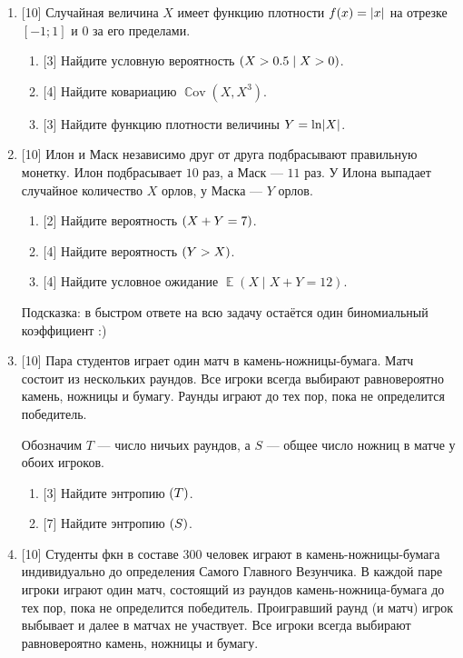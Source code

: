 \documentclass[12pt]{article}
\DeclareMathOperator{\Cov}{\mathbb{C}ov}
\let\P\relax
\DeclareMathOperator{\P}{\mathbb{P}}
\let\H\relax
\DeclareMathOperator{\H}{\mathbb{H}}
\DeclareMathOperator{\E}{\mathbb{E}}
\DeclarePairedDelimiter{\abs}{\lvert}{\rvert}
\begin{document}
\begin{enumerate}
    \item {[10]} Случайная величина $X$ имеет функцию плотности $f(x) = \abs{x}$ на отрезке $[-1;1]$ и $0$ за его пределами.
    \begin{enumerate}
        \item {[3]} Найдите условную вероятность $\P(X > 0.5 \mid X > 0)$.
        \item {[4]} Найдите ковариацию $\Cov(X, X^3)$.
        \item {[3]} Найдите функцию плотности величины $Y = \ln \abs{X}$.
    \end{enumerate}

    \item {[10]} Илон и Маск независимо друг от друга подбрасывают правильную монетку.
    Илон подбрасывает $10$ раз, а Маск — $11$ раз. 
    У Илона выпадает случайное количество $X$ орлов, у Маска — $Y$ орлов. 

    \begin{enumerate}
        \item {[2]} Найдите вероятность $\P(X + Y = 7)$.
        \item {[4]} Найдите вероятность $\P(Y > X)$.
        \item {[4]} Найдите условное ожидание $\E(X \mid X + Y = 12)$.
    \end{enumerate}

    Подсказка: в быстром ответе на всю задачу остаётся один биномиальный коэффициент :)



    \item {[10]} Пара студентов играет один матч в камень-ножницы-бумага.
    Матч состоит из нескольких раундов.
    Все игроки всегда выбирают равновероятно камень, ножницы и бумагу. 
    Раунды играют до тех пор, пока не определится победитель. 

    Обозначим $T$ — число ничьих раундов, а $S$ — общее число ножниц в матче у обоих игроков. 
    \begin{enumerate}
        \item {[3]} Найдите энтропию $\H(T)$.
        \item {[7]} Найдите энтропию $\H(S)$.
    \end{enumerate}


    \item {[10]} Студенты фкн в составе 300 человек играют в камень-ножницы-бумага индивидуально до определения Самого Главного Везунчика.
    В каждой паре игроки играют один матч, состоящий из раундов камень-ножница-бумага до тех пор, пока не определится победитель.
    Проигравший раунд (и матч) игрок выбывает и далее в матчах не участвует. 
    Все игроки всегда выбирают равновероятно камень, ножницы и бумагу. 


\end{enumerate}
\end{document}
